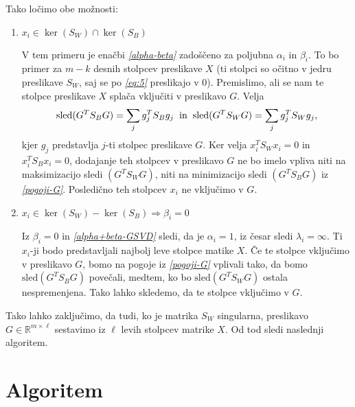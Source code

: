 \documentclass[mat1]{article}
\theoremstyle{definition}
\begin{document}
Tako ločimo obe možnosti:
\begin{enumerate}
\item{$x_i \in \ker (S_W) \cap \ker (S_B)$}

V tem primeru je enačbi \textit{\eqref{alpha-beta}} zadoščeno za poljubna $\alpha_i$ in $\beta_i$. To bo primer za $m-k$ desnih stolpcev preslikave $X$ (ti stolpci so očitno v jedru preslikave $S_W$, saj se po \textit{\eqref{eq:5}} preslikajo v 0). Premislimo, ali se nam te stolpce preslikave $X$ splača vključiti v preslikavo $G$. Velja
$$
\text{sled}(G^T S_B G) = \sum_j g_j^T S_B g_j
\hspace{2mm}
\text{in}
\hspace{2mm}
\text{sled}(G^T S_W G) = \sum_j g_j^T S_W g_j
\text{,}
$$
kjer $g_j$ predstavlja $j$-ti stolpec preslikave $G$. Ker velja $x_i^T S_W x_i = 0$ in $x_i^T S_B x_i = 0$, dodajanje teh stolpcev v preslikavo $G$ ne bo imelo vpliva niti na maksimizacijo sledi $\left( G^T S_W G \right)$, niti na minimizacijo sledi $\left( G^T S_B G \right)$ iz \textit{\eqref{pogoji-G}}. Posledično teh stolpcev $x_i$ ne vključimo v $G$.

\item{$x_i \in \ker (S_W) - \ker (S_B) 	\Rightarrow \beta_i = 0$}

Iz $\beta_i = 0$ in \textit{\eqref{alpha+beta-GSVD}} sledi, da je $\alpha_i = 1$, iz česar sledi $\lambda_i = \infty$. Ti $x_i$-ji bodo predstavljali najbolj leve stolpce matike $X$. Če te stolpce vključimo v preslikavo $G$, bomo na pogoje iz \textit{\eqref{pogoji-G}} vplivali tako, da bomo $\text{sled}(G^T S_B G)$ povečali, medtem, ko bo $\text{sled}(G^T S_W G)$ ostala nespremenjena. Tako lahko skledemo, da te stolpce vključimo v $G$.
\end{enumerate}
Tako lahko zaključimo, da tudi, ko je matrika $S_W$ singularna, preslikavo $G \in \mathbb{R}^{m \times \ell}$ sestavimo iz $\ell$ levih stolpcev matrike $X$. Od tod sledi naslednji algoritem.

\newpage 
\section{Algoritem}
\end{document}
